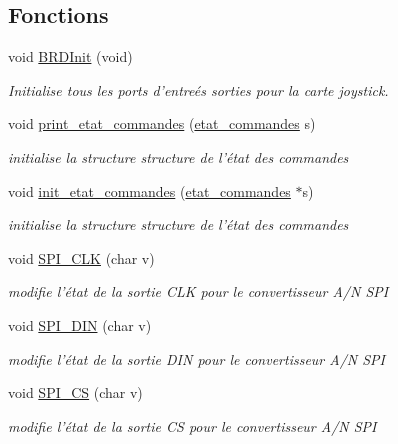 \subsection*{Fonctions}
\begin{DoxyCompactItemize}
\item 
void \hyperlink{group___i_o_ga9cb15ec1781380780672afe306a163ec}{B\-R\-D\-Init} (void)
\begin{DoxyCompactList}\small\item\em Initialise tous les ports d'entreés sorties pour la carte joystick. \end{DoxyCompactList}\item 
void \hyperlink{group___i_o_gaba1669c59c764f752e4759af60633240}{print\-\_\-etat\-\_\-commandes} (\hyperlink{structetat__commandes}{etat\-\_\-commandes} s)
\begin{DoxyCompactList}\small\item\em initialise la structure structure de l'état des commandes \end{DoxyCompactList}\item 
void \hyperlink{group___i_o_ga47503442984c9244a27e7b95ffa472c3}{init\-\_\-etat\-\_\-commandes} (\hyperlink{structetat__commandes}{etat\-\_\-commandes} $\ast$s)
\begin{DoxyCompactList}\small\item\em initialise la structure structure de l'état des commandes \end{DoxyCompactList}\item 
void \hyperlink{group___i_o_gaf61e8f99c1568bc62cd24251e4cc0fa2}{S\-P\-I\-\_\-\-C\-L\-K} (char v)
\begin{DoxyCompactList}\small\item\em modifie l'état de la sortie C\-L\-K pour le convertisseur A/\-N S\-P\-I \end{DoxyCompactList}\item 
void \hyperlink{group___i_o_ga831fe77ab7ce75ba9a41ecb3c08a97d9}{S\-P\-I\-\_\-\-D\-I\-N} (char v)
\begin{DoxyCompactList}\small\item\em modifie l'état de la sortie D\-I\-N pour le convertisseur A/\-N S\-P\-I \end{DoxyCompactList}\item 
void \hyperlink{group___i_o_gab5cfdcd0547c9f87516a805b4849d64f}{S\-P\-I\-\_\-\-C\-S} (char v)
\begin{DoxyCompactList}\small\item\em modifie l'état de la sortie C\-S pour le convertisseur A/\-N S\-P\-I \end{DoxyCompactList}\item 

\end{DoxyCompactItemize}
